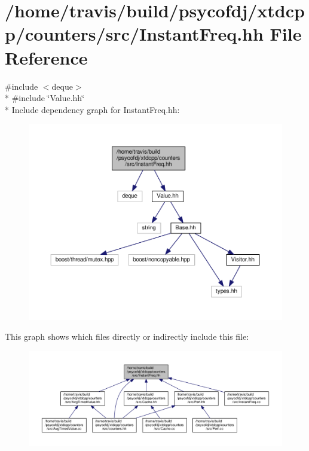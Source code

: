 \hypertarget{InstantFreq_8hh}{\section{/home/travis/build/psycofdj/xtdcpp/counters/src/\-Instant\-Freq.hh File Reference}
\label{InstantFreq_8hh}
}
{\ttfamily \#include $<$deque$>$}\\*
{\ttfamily \#include \char`\"{}Value.\-hh\char`\"{}}\\*
Include dependency graph for Instant\-Freq.\-hh\-:
\nopagebreak
\begin{figure}[H]
\begin{center}
\leavevmode
\includegraphics[width=350pt]{InstantFreq_8hh__incl}
\end{center}
\end{figure}
This graph shows which files directly or indirectly include this file\-:
\nopagebreak
\begin{figure}[H]
\begin{center}
\leavevmode
\includegraphics[width=350pt]{InstantFreq_8hh__dep__incl}
\end{center}
\end{figure}
